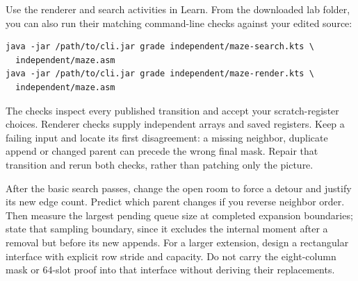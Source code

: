 Use the renderer and search activities in Learn. From the downloaded lab folder,
you can also run their matching command-line checks against your edited source:
\begin{verbatim}
java -jar /path/to/cli.jar grade independent/maze-search.kts \
  independent/maze.asm
java -jar /path/to/cli.jar grade independent/maze-render.kts \
  independent/maze.asm
\end{verbatim}
The checks inspect every published transition and accept your scratch-register
choices. Renderer checks supply independent arrays and saved registers. Keep a
failing input and locate its first disagreement: a missing neighbor, duplicate
append or changed parent can precede the wrong final mask. Repair that transition
and rerun both checks, rather than patching only the picture.

After the basic search passes, change the open room to force a detour and justify
its new edge count. Predict which parent changes if you reverse neighbor order.
Then measure the largest pending queue size at completed expansion boundaries;
state that sampling boundary, since it excludes the internal moment after a
removal but before its new appends. For a larger extension, design a rectangular
interface with explicit row stride and capacity. Do not carry the eight-column
mask or 64-slot proof into that interface without deriving their replacements.
